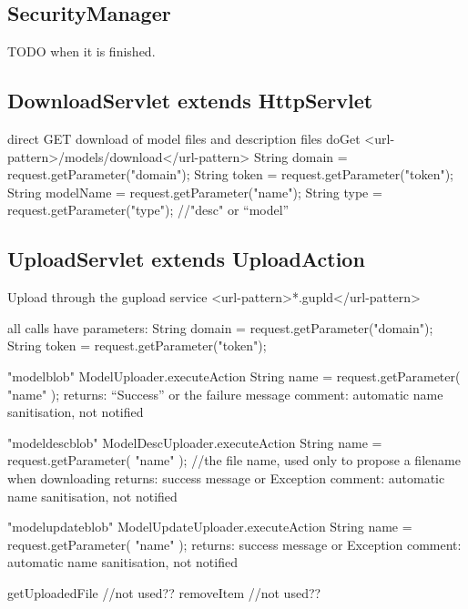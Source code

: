 \subsection{SecurityManager}
TODO when it is finished.

\subsection{DownloadServlet extends HttpServlet }  
direct GET download of model files and description files
doGet <url-pattern>/models/download</url-pattern>
	String domain = request.getParameter("domain");
	String token = request.getParameter("token");
	String modelName = request.getParameter("name");
	String type = request.getParameter("type");  //"desc" or ``model''
	
\subsection{UploadServlet extends UploadAction }  
Upload through the gupload service
<url-pattern>*.gupld</url-pattern>

all calls have parameters: 
	String domain = request.getParameter("domain");		
	String token = request.getParameter("token");
   
	"modelblob"
	ModelUploader.executeAction
	String name = request.getParameter( "name" );
	returns: ``Success'' or the failure message
	comment: automatic name sanitisation, not notified
	
	"modeldescblob"
	ModelDescUploader.executeAction
	String name = request.getParameter( "name" ); //the file name, used only to propose a filename when downloading
	returns: success message or Exception
	comment: automatic name sanitisation, not notified
	
	"modelupdateblob"
	ModelUpdateUploader.executeAction
	String name = request.getParameter( "name" );
	returns: success message or Exception
	comment: automatic name sanitisation, not notified
	
	getUploadedFile  //not used??
	removeItem  //not used??
	



